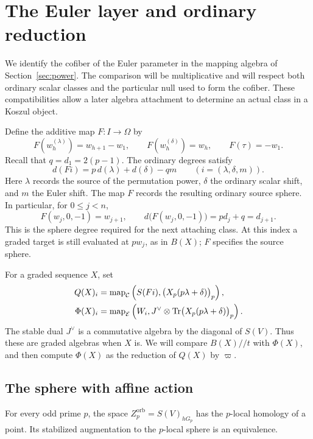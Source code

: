 \section{The Euler layer and ordinary reduction}
\label{sec:layer}

We identify the cofiber of the Euler parameter in the mapping algebra
of Section~\ref{sec:power}. The comparison will be multiplicative and
will respect both ordinary scalar classes and the particular null
used to form the cofiber. These compatibilities allow a later algebra
attachment to determine an actual class in a Koszul object.

Define the additive map $F:I\to\Omega$ by
\[
 F(w_h^{(\lambda)})=w_{h+1}-w_1,
 \qquad F(w_h^{(\delta)})=w_h,
 \qquad F(\tau)=-w_1.
\]
Recall that $q=d_1=2(p-1)$. The ordinary degrees satisfy
\begin{equation}
 \label{layer:degree}
 d(Fi)=p\,d(\lambda)+d(\delta)-qm
 \qquad (i=(\lambda,\delta,m)).
\end{equation}
Here $\lambda$ records the source of the permutation power,
$\delta$ the ordinary scalar shift, and $m$ the Euler shift. The
map $F$ records the resulting ordinary source sphere. In particular,
for $0\leq j<n$,
\[
 F(w_j,0,-1)=w_{j+1},\qquad
 d\bigl(F(w_j,0,-1)\bigr)=p d_j+q=d_{j+1}.
\]
This is the sphere degree required for the next attaching class.
At this index a graded target is still evaluated at $p w_j$, as in
$B(X)$; $F$ specifies the source sphere.

For a graded sequence $X$, set
\[
 \begin{split}
 Q(X)_i&=\operatorname{map}_{\mathcal C}
 \left(S(Fi),\bigl(X_p(p\lambda+\delta)\bigr)_p\right),\\
 \Phi(X)_i&=\operatorname{map}_{\mathcal E}
 \left(W_i,J^\vee\otimes
 \operatorname{Tr}\bigl(X_p(p\lambda+\delta)\bigr)_p\right).
 \end{split}
\]
The stable dual $J^\vee$ is a commutative algebra by the diagonal of
$S(V)$. Thus these are graded algebras when $X$ is. We will compare
$B(X)//t$ with $\Phi(X)$, and then compute $\Phi(X)$ as the reduction
of $Q(X)$ by $\varpi$.

\subsection{The sphere with affine action}

\begin{lemma}
\label{layer:acyclic-sphere}
For every odd prime $p$, the space
$Z_p^{\mathrm{orb}}=S(V)_{hG_p}$ has the $p$-local homology of a
point. Its stabilized augmentation to the $p$-local sphere is an
equivalence.
\end{lemma}

